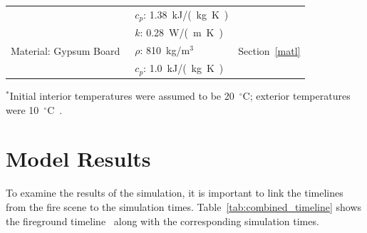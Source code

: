\documentclass[12pt,oneside]{book}
\begin{document}
\begin{table}[!ht]
\begin{tabular}{lll}
                                                           &  $c_{p}$: 1.38~\si{kJ/(kg.K)}                 &                                       \\ [.25cm]
\multirow{3}{*}{Material: Gypsum Board~\cite{WAKILI2007}}  &  $k$: 0.28~\si{W/(m.K)}                       & \multirow{3}{*}{Section~\ref{matl}}   \\ 
                                                           &  $\rho$: 810~kg/m$^3$                         &                                       \\ 
                                                           &  $c_{p}$: 1.0~\si{kJ/(kg.K)}                  &                                       \\
\bottomrule[1.25pt]
\end{tabular}\par
\footnotesize
$^{*}$Initial interior temperatures were assumed to be 20~$^{\circ}$C; exterior temperatures were 10~$^{\circ}$C~\cite{PGCounty2013}.
\normalsize
\end{table}


\chapter{Model Results}
\label{results}

To examine the results of the simulation, it is important to link the timelines from the fire scene to the simulation times. Table~\ref{tab:combined_timeline} shows the fireground timeline~\cite{PGCounty2013} along with the corresponding simulation times.
\end{document}
